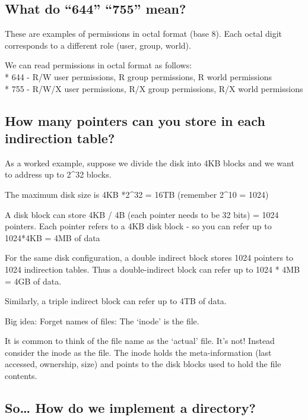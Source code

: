 \subsection{\texorpdfstring{What do ``644'' ``755''
mean?}{What do 644 755 mean?}}\label{what-do-644-755-mean}

These are examples of permissions in octal format (base 8). Each octal
digit corresponds to a different role (user, group, world).

We can read permissions in octal format as follows:\\
* 644 - R/W user permissions, R group permissions, R world permissions\\
* 755 - R/W/X user permissions, R/X group permissions, R/X world
permissions

\subsection{How many pointers can you store in each indirection
table?}\label{how-many-pointers-can-you-store-in-each-indirection-table}

As a worked example, suppose we divide the disk into 4KB blocks and we
want to address up to 2\^{}32 blocks.

The maximum disk size is 4KB *2\^{}32 = 16TB (remember 2\^{}10 = 1024)

A disk block can store 4KB / 4B (each pointer needs to be 32 bits) =
1024 pointers. Each pointer refers to a 4KB disk block - so you can
refer up to 1024*4KB = 4MB of data

For the same disk configuration, a double indirect block stores 1024
pointers to 1024 indirection tables. Thus a double-indirect block can
refer up to 1024 * 4MB = 4GB of data.

Similarly, a triple indirect block can refer up to 4TB of data.

Big idea: Forget names of files: The `inode' is the file.

It is common to think of the file name as the `actual' file. It's not!
Instead consider the inode as the file. The inode holds the
meta-information (last accessed, ownership, size) and points to the disk
blocks used to hold the file contents.

\subsection{So\ldots{} How do we implement a
directory?}\label{so-how-do-we-implement-a-directory}

